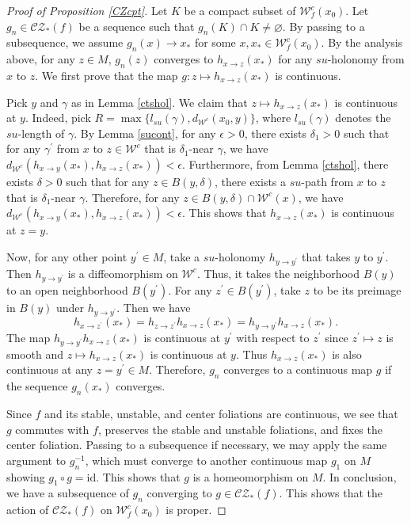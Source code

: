 \documentclass[11pt]{amsart}
\numberwithin{equation}{section}
\newcommand{\W}{\mathcal{W}}
\newcommand{\CZ}{\mathcal{CZ}}
\theoremstyle{plain}
\begin{document}
\begin{proof}[Proof of Proposition \ref{CZcpt}]
{Let $K$ be a compact subset of $\W^c_f(x_0)$. Let $g_n\in \CZ_*(f)$ be a sequence such that $g_n(K)\cap K\neq \varnothing$. By passing to a subsequence, we assume $g_n(x)\to x_*$ for some $x,x_*\in \W^c_f(x_0)$. By the analysis above, for any $z\in M$, $g_n(z)$ converges to $h_{x\to z}(x_*)$ for any $su$-holonomy from $x$ to $z$. We first prove that the map $g: z\mapsto h_{x\to z}(x_*)$} is continuous.

Pick $y$ and $\gamma$ as in Lemma \ref{ctshol}. We claim that $z\mapsto h_{x\to z}(x_*)$ is continuous at $y$. Indeed, pick $R=\max\{l_{su}(\gamma),d_{\W^c}(x_0,y)\}$, where $l_{su}(\gamma)$ denotes the $su$-length of $\gamma$. By Lemma \ref{sucont}, for any $\epsilon>0$, there exists $\delta_1>0$ such that for any $\gamma^\prime$ from $x$ to $z\in \W^c$ that is $\delta_1$-near $\gamma$, we have {$d_{\W^c}(h_{x\to y}(x_*),h_{x\to z}(x_*))<\epsilon$}. Furthermore, from Lemma \ref{ctshol}, there exists $\delta>0$ such that for any $z\in B(y,\delta)$, there exists a $su$-path from $x$ to $z$ that is $\delta_1$-near $\gamma$. Therefore, for any $z\in B(y,\delta)\cap \W^c(x)$, we have {$d_{\W^c}(h_{x\to y}(x_*),h_{x\to z}(x_*))<\epsilon$}. This shows that $h_{x\to z}(x_*)$ is continuous at $z=y$.

Now, for any other point $y^\prime\in M$, take a $su$-holonomy $h_{y\to y^\prime}$ that takes $y$ to $y^\prime$. Then $h_{y\to y^\prime}$ is a diffeomorphism on $\W^c$. Thus, it takes the neighborhood $B(y)$ to an open neighborhood $B(y^\prime)$. For any $z^\prime\in B(y^\prime)$, take $z$ to be its preimage in $B(y)$ under $h_{y\to y^\prime}$. Then we have
$$h_{x\to z^\prime}(x_*)=h_{z\to z^\prime}h_{x\to z}(x_*)=h_{y\to y^\prime}h_{x\to z}(x_*).$$
The map $h_{y\to y^\prime}h_{x\to z}(x_*)$ is continuous at $y^\prime$ with respect to $z^\prime$ since $z^\prime \mapsto z$ is smooth and $z\mapsto h_{x\to z}(x_*)$ is continuous at $y$. Thus $h_{x\to z}(x_*)$ is also continuous at any $z=y^\prime\in M$. Therefore, $g_n$ converges to a continuous map $g$ if the sequence $g_n(x_*)$ converges.

{Since $f$ and its stable, unstable, and center foliations are continuous, we see that $g$ commutes with $f$, preserves the stable and unstable foliations, and fixes the center foliation. Passing to a subsequence if necessary, we may apply the same argument to $g_n^{-1}$, which must converge to another continuous map $g_1$ on $M$ showing $g_1\circ g=\mathrm{id}$. This shows that $g$ is a homeomorphism on $M$. In conclusion, we have a subsequence of $g_n$ converging to $g\in \CZ_*(f)$. This shows that the action of $\CZ_*(f)$ on $\W^c_f(x_0)$ is proper.}
\end{proof}
\end{document}
